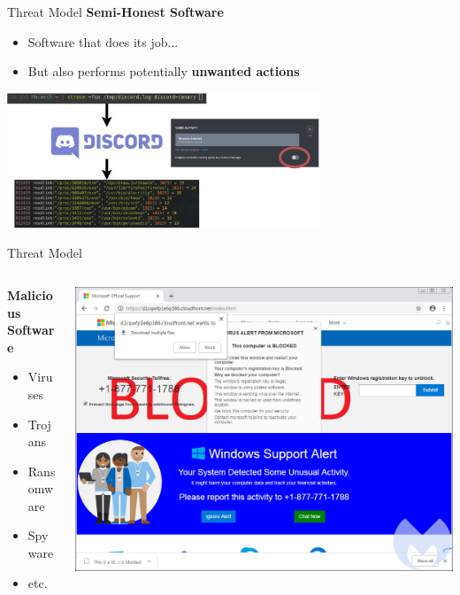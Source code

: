 \documentclass[12pt, dvipsnames, aspectratio=169]{beamer}
\begin{document}
\begin{frame}[t]{Threat Model}
    \textbf{Semi-Honest Software}
    \begin{itemize}
        \item Software that does its job...
        \item But also performs potentially \textbf{unwanted actions}
    \end{itemize}
    \begin{center}
        \color{black}
        \includegraphics[width=0.7\textwidth]{figs/discord.pdf}
    \end{center}
\end{frame}

\begin{frame}[c]{Threat Model}
\begin{columns}
    \begin{column}{0.3\textwidth}
        \textbf{Malicious Software}
        \begin{itemize}
            \item Viruses
            \item Trojans
            \item Ransomware
            \item Spyware
            \item etc.
        \end{itemize}
    \end{column}
    \begin{column}{0.6\textwidth}
        \color{black}
        \includegraphics[width=1\textwidth]{figs/fake-av.png}
    \end{column}
\end{columns}
\end{frame}
\end{document}
